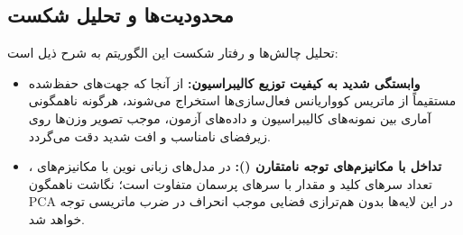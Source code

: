 \subsection{محدودیت‌ها و تحلیل شکست}
تحلیل چالش‌ها و رفتار شکست این الگوریتم به شرح ذیل است:
\begin{itemize}
    \item \textbf{وابستگی شدید به کیفیت توزیع کالیبراسیون:} از آنجا که جهت‌های حفظ‌شده مستقیماً از ماتریس کوواریانس فعال‌سازی‌ها استخراج می‌شوند، هرگونه ناهمگونی آماری بین نمونه‌های کالیبراسیون و داده‌های آزمون، موجب تصویر وزن‌ها روی زیرفضای نامناسب و افت شدید دقت می‌گردد.
    \item \textbf{تداخل با مکانیزم‌های توجه نامتقارن ():} در مدل‌های زبانی نوین با مکانیزم‌های ، تعداد سرهای کلید و مقدار با سرهای پرسمان متفاوت است؛ نگاشت ناهمگون PCA در این لایه‌ها بدون هم‌ترازی فضایی موجب انحراف در ضرب ماتریسی توجه خواهد شد.
\end{itemize}
